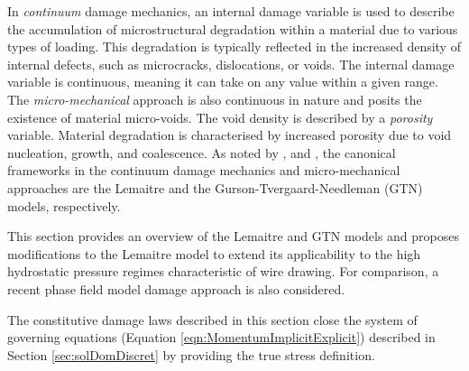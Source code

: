 \documentclass[sn-mathphys,Numbered]{sn-jnl}%
\begin{document}
In \emph{continuum} damage mechanics, an internal damage variable is used to describe the accumulation of microstructural degradation within a material due to various types of loading.
This degradation is typically reflected in the increased density of internal defects, such as microcracks, dislocations, or voids.
The internal damage variable is continuous, meaning it can take on any value within a given range.
The \emph{micro-mechanical} approach is also continuous in nature and posits the existence of material micro-voids.
The void density is described by a \emph{porosity} variable.
Material degradation is characterised by increased porosity due to void nucleation, growth, and coalescence.
As noted by \citet{besson_continuum_2010}, \citet{cao_models_2017} and \citet{tekkaya_damage_2020}, the canonical frameworks in the continuum damage mechanics and micro-mechanical approaches are the Lemaitre \cite{lemaitre_continuous_1985,lemaitre_engineering_2005} and the Gurson-Tvergaard-Needleman (GTN) \cite{gurson_continuum_1977,tvergaard_analysis_1984} models, respectively.

This section provides an overview of the Lemaitre and GTN models and proposes modifications to the Lemaitre model to extend its applicability to the high hydrostatic pressure regimes characteristic of wire drawing.
For comparison, a recent phase field model damage approach is also considered.

The constitutive damage laws described in this section close the system of governing equations (Equation \ref{eqn:MomentumImplicitExplicit}) described in Section \ref{sec:solDomDiscret} by providing the true stress definition.


%
\end{document}
